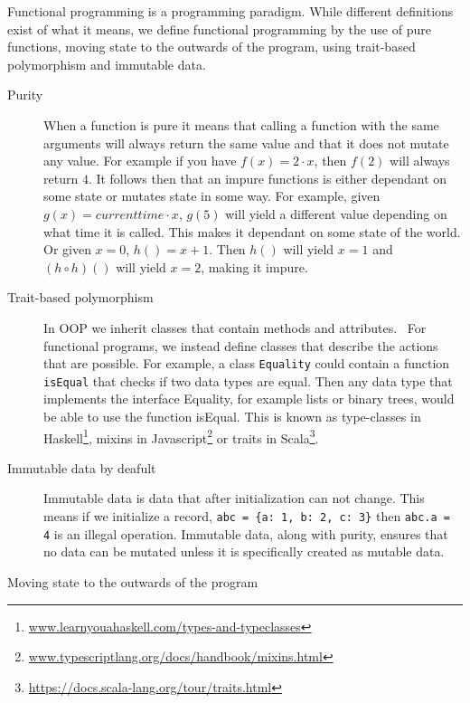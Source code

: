 Functional programming is a programming paradigm. While different definitions exist
of what it means, we define functional programming by the use of pure functions,
moving state to the outwards of the program, using trait-based polymorphism and
immutable data.

\begin{description}
\item[ Purity ]

When a function is pure it means that calling a function with the same arguments
        will always return the same value and that it does not mutate any value.
        For example if you have $f(x) = 2\cdot x$, then $f(2)$ will always
        return $4$. It follows then that an impure functions is either dependant
        on some state or mutates state in some way. For example, given $g(x) =
        currenttime \cdot x$, $g(5)$ will yield a different value depending on
        what time it is called. This makes it dependant on some state of the
        world. Or given $x=0$, $h()=x+1$. Then $h()$ will yield $x=1$ and $(h
        \circ h)()$ will yield $x=2$, making it impure.~\cite{wikipedia_pure}

	\item[ Trait-based polymorphism ]

		In OOP we inherit classes that contain methods and
attributes.~\cite{Gamma:1995:DPE:186897} For functional programs, we instead
define classes that describe the actions that are possible. For example, a
class \texttt{Equality} could contain a function \texttt{isEqual} that checks
if two data types are equal. Then any data type that implements the interface
Equality, for example lists or binary trees, would be able to use the function
isEqual.  This is known as type-classes in
Haskell\footnote{\url{www.learnyouahaskell.com/types-and-typeclasses}}, mixins
in Javascript\footnote{\url{www.typescriptlang.org/docs/handbook/mixins.html}}
or traits in Scala\footnote{\url{https://docs.scala-lang.org/tour/traits.html}}.

\item[ Immutable data by deafult ]

Immutable data is data that after initialization can not change. This means if
we initialize a record, \texttt{abc = \{a: 1, b: 2, c: 3\}} then \texttt{abc.a
= 4} is an illegal operation. Immutable data, along with purity, ensures that
no data can be mutated unless it is specifically created as mutable data.

\item[Moving state to the outwards of the program]


\end{description}
